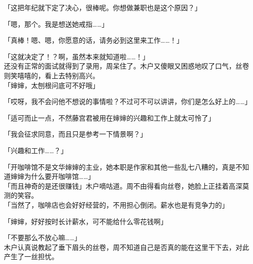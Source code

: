「这把年纪就下定了决心，很棒呢。你想做兼职也是这个原因？」

「嗯，那个。我是想送她戒指……」

「真棒！嗯、嗯，你愿意的话，请务必到这里来工作……！」

「这就决定了！？啊，虽然本来就知道啦……！」\\

还没有正常的面试就得到了录用，周呆住了。木户又傻眼又困惑地叹了口气，丝卷则笑嘻嘻的，看上去特别高兴。\\

「婶婶，太刨根问底可不好哦」

「哎呀，我不会问他不想说的事情啦？不过可不可以讲讲，你们是怎么好上的……」

「适可而止一点，不然藤宫君被用在婶婶的兴趣和工作上就太可怜了」

「我会征求同意，而且只是参考一下情景啊？」

「兴趣和工作……？」

「开咖啡馆不是文华婶婶的主业，她本职是作家和其他一些乱七八糟的，真是不知道婶婶为什么要开咖啡馆……」\\

「而且神奇的是还很赚钱」木户嘀咕道。周不由得看向丝卷，她脸上正挂着高深莫测的笑容。\\

「当然了，咖啡店也会好好经营的，不用担心倒闭。薪水也是有竞争力的」

「婶婶，好好按时长计薪水，可不能给什么零花钱啊」

「不要那么不放心嘛……」\\

木户认真说教起了垂下眉头的丝卷，周不知道自己是否真的能在这里干下去，对此产生了一丝担忧。
